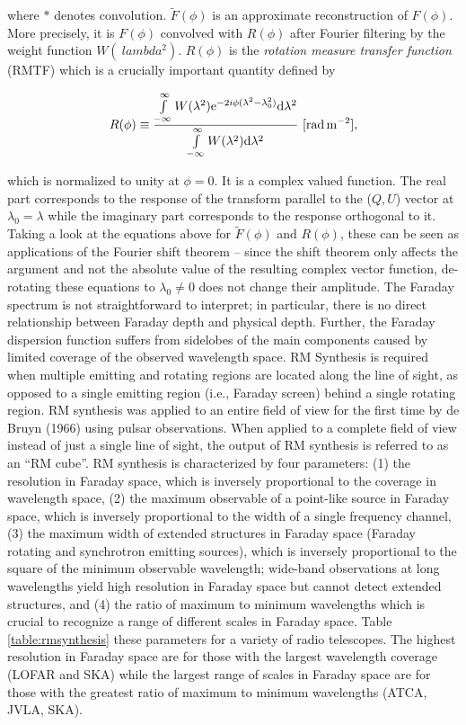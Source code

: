 \documentclass[a4paper,10pt]{article}
\begin{document}
{\noindent}where $*$ denotes convolution. $\tilde{F}(\phi)$ is an approximate reconstruction of $F(\phi)$. More precisely, it is $F(\phi)$ convolved with $R(\phi)$ after Fourier filtering by the weight function $W(\
lambda^2)$. $R(\phi)$ is the \textit{rotation measure transfer function} (RMTF) which is a crucially important quantity defined by

\begin{align*}
    R(\phi) \equiv \dfrac{\int\limits_{-\infty}^\infty W(\lambda^2)\mathrm{e}^{-2i\phi(\lambda^2-\lambda_0^2)}\mathrm{d}\lambda^2}{\int\limits_{-\infty}^\infty W(\lambda^2)\mathrm{d}\lambda^2} ~ [{\rm rad\,m^{-2}}],
\end{align*}

{\noindent}which is normalized to unity at $\phi=0$. It is a complex valued function. The real part corresponds to the response of the transform parallel to the ($Q,U$) vector at $\lambda_0=\lambda$ while the imaginary part corresponds to the response orthogonal to it. Taking a look at the equations above for $\tilde{F}(\phi)$ and $R(\phi)$, these can be seen as applications of the Fourier shift theorem -- since the shift theorem only affects the argument and not the absolute value of the resulting complex vector function, de-rotating these equations to $\lambda_0\neq0$ does not change their amplitude. The Faraday spectrum is not straightforward to interpret; in particular, there is no direct relationship between Faraday depth and physical depth. Further, the Faraday dispersion function suffers from sidelobes of the main components caused by limited coverage of the observed wavelength space. RM Synthesis is required when multiple emitting and rotating regions are located along the line of sight, as opposed to a single emitting region (i.e., Faraday screen) behind a single rotating region. RM synthesis was applied to an entire field of view for the first time by de Bruyn (1966) using pulsar observations. When applied to a complete field of view instead of just a single line of sight, the output of RM synthesis is referred to as an ``RM cube''. RM synthesis is characterized by four parameters: (1) the resolution in Faraday space, which is inversely proportional to the coverage in wavelength space, (2) the maximum observable of a point-like source in Faraday space, which is inversely proportional to the width of a single frequency channel, (3) the maximum width of extended structures in Faraday space (Faraday rotating and synchrotron emitting sources), which is inversely proportional to the square of the minimum observable wavelength; wide-band observations at long wavelengths yield high resolution in Faraday space but cannot detect extended structures, and (4) the ratio of maximum to minimum wavelengths which is crucial to recognize a range of different scales in Faraday space. Table \ref{table:rmsynthesis} these parameters for a variety of radio telescopes. The highest resolution in Faraday space are for those with the largest wavelength coverage (LOFAR and SKA) while the largest range of scales in Faraday space are for those with the greatest ratio of maximum to minimum wavelengths (ATCA, JVLA, SKA).
\end{document}
